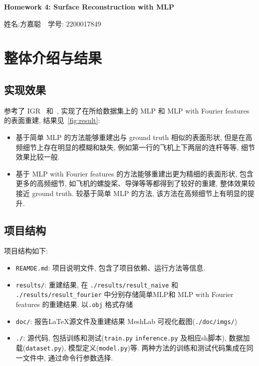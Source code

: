 \documentclass[11pt]{article}
\newcommand\1{\mathds{1}}
\begin{document}
\pagestyle{fancy}
\chead{}
\fancyfoot[R]{} 
\fancyfoot[C]{\thepage\ /\ \pageref{LastPage} \\ \textcolor{lightgray}{最后编译时间: \today}}


\begin{center}
    {\LARGE \bf Homework 4: Surface Reconstruction with MLP} 

    {\kaishu 姓名:方嘉聪\ \  学号: 2200017849}            %
\end{center}

\section{整体介绍与结果}
\subsection{实现效果}
参考了 IGR~\cite{gropp2020implicitgeometricregularizationlearning} 和~\cite{tancik2020fourierfeaturesletnetworks}, 实现了在所给数据集上的 MLP 和 MLP with Fourier features 的表面重建, 结果见~\cref{fig:result}:
\begin{itemize}
  \item 基于简单 MLP 的方法能够重建出与 ground truth 相似的表面形状, 但是在高频细节上存在明显的模糊和缺失, 例如第一行的飞机上下两层的连杆等等, 细节效果比较一般.
  \item 基于 MLP with Fourier features 的方法能够重建出更为精细的表面形状, 包含更多的高频细节, 如飞机的螺旋桨、导弹等等都得到了较好的重建, 整体效果较接近 ground truth. 较基于简单 MLP 的方法, 该方法在高频细节上有明显的提升.
\end{itemize}
\subsection{项目结构}
项目结构如下:
\begin{itemize}
  \item \texttt{REAMDE.md}: 项目说明文件, 包含了项目依赖、运行方法等信息.
  \item \texttt{results/}: 重建结果, 在 \texttt{./results/result\_naive} 和 \texttt{./results/result\_fourier} 中分别存储简单MLP和 MLP with Fourier features 的重建结果. 以\texttt{.obj} 格式存储
  \item \texttt{doc/}: 报告\LaTeX 源文件及重建结果 MeshLab 可视化截图(\texttt{./doc/imgs/})
  \item \texttt{./}: 源代码, 包括训练和测试(\texttt{train.py} \texttt{inference.py} 及相应sh脚本), 数据加载(\texttt{dataset.py}), 模型定义(\texttt{model.py})等. 两种方法的训练和测试代码集成在同一文件中, 通过命令行参数选择.
\end{itemize}
\end{document}
